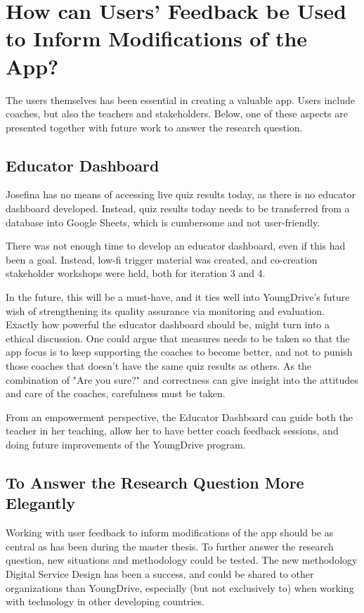 \section{How can Users' Feedback be Used to Inform Modifications of the App?}

The users themselves has been essential in creating a valuable app. Users include coaches, but also the teachers and stakeholders. Below, one of these aspects are presented together with future work to answer the research question.

\subsection{Educator Dashboard}
Josefina has no means of accessing live quiz results today, as there is no educator dashboard developed. Instead, quiz results today needs to be transferred from a database into Google Sheets, which is cumbersome and not user-friendly.

There was not enough time to develop an educator dashboard, even if this had been a goal. Instead, low-fi trigger material was created, and co-creation stakeholder workshops were held, both for iteration 3 and 4.

In the future, this will be a must-have, and it ties well into YoungDrive's future wish of strengthening its quality assurance via monitoring and evaluation. Exactly how powerful the educator dashboard should be, might turn into a ethical discussion. One could argue that measures needs to be taken so that the app focus is to keep supporting the coaches to become better, and not to punish those coaches that doesn't have the same quiz results as others. As the combination of "Are you sure?" and correctness can give insight into the attitudes and care of the coaches, carefulness must be taken.

From an empowerment perspective, the Educator Dashboard can guide both the teacher in her teaching, allow her to have better coach feedback sessions, and doing future improvements of the YoungDrive program.

\subsection{To Answer the Research Question More Elegantly}
Working with user feedback to inform modifications of the app should be as central as has been during the master thesis. To further answer the research question, new situations and methodology could be tested. The new methodology Digital Service Design has been a success, and could be shared to other organizations than YoungDrive, especially (but not exclusively to) when working with technology in other developing countries.

